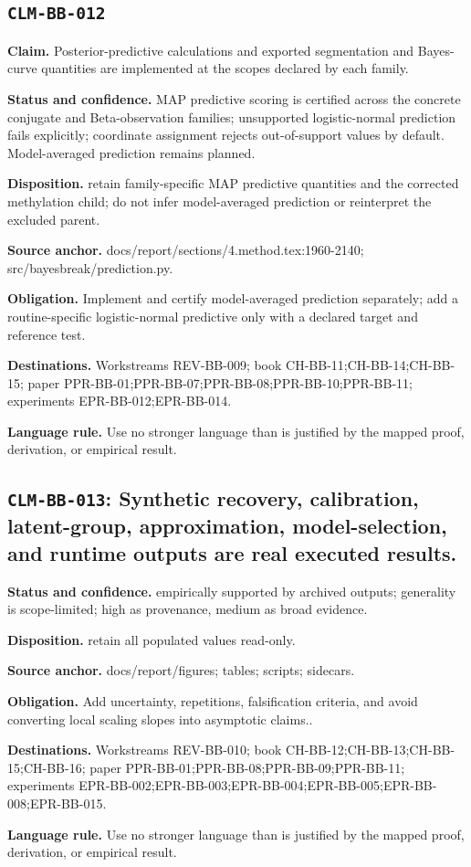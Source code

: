 \subsection{\texttt{CLM-BB-012}}
\textbf{Claim.} Posterior-predictive calculations and exported segmentation and Bayes-curve quantities are implemented at the scopes declared by each family.\par
\textbf{Status and confidence.} MAP predictive scoring is certified across the concrete conjugate and Beta-observation families; unsupported logistic-normal prediction fails explicitly; coordinate assignment rejects out-of-support values by default. Model-averaged prediction remains planned.\par
\textbf{Disposition.} retain family-specific MAP predictive quantities and the corrected methylation child; do not infer model-averaged prediction or reinterpret the excluded parent.\par
\textbf{Source anchor.} docs/report/sections/4.method.tex:1960-2140; src/bayesbreak/prediction.py.\par
\textbf{Obligation.} Implement and certify model-averaged prediction separately; add a routine-specific logistic-normal predictive only with a declared target and reference test.\par
\textbf{Destinations.} Workstreams REV-BB-009; book CH-BB-11;CH-BB-14;CH-BB-15; paper PPR-BB-01;PPR-BB-07;PPR-BB-08;PPR-BB-10;PPR-BB-11; experiments EPR-BB-012;EPR-BB-014.\par
\textbf{Language rule.} Use no stronger language than is justified by the mapped proof, derivation, or empirical result.

\subsection[\texttt{CLM-BB-013}]{\texttt{CLM-BB-013}: Synthetic recovery, calibration, latent-group, approximation, model-selection, and runtime outputs are real executed results.}
\textbf{Status and confidence.} empirically supported by archived outputs; generality is scope-limited; high as provenance, medium as broad evidence.\par
\textbf{Disposition.} retain all populated values read-only.\par
\textbf{Source anchor.} docs/report/figures; tables; scripts; sidecars.\par
\textbf{Obligation.} Add uncertainty, repetitions, falsification criteria, and avoid converting local scaling slopes into asymptotic claims..\par
\textbf{Destinations.} Workstreams REV-BB-010; book CH-BB-12;CH-BB-13;CH-BB-15;CH-BB-16; paper PPR-BB-01;PPR-BB-08;PPR-BB-09;PPR-BB-11; experiments EPR-BB-002;EPR-BB-003;EPR-BB-004;EPR-BB-005;EPR-BB-008;EPR-BB-015.\par
\textbf{Language rule.} Use no stronger language than is justified by the mapped proof, derivation, or empirical result.

